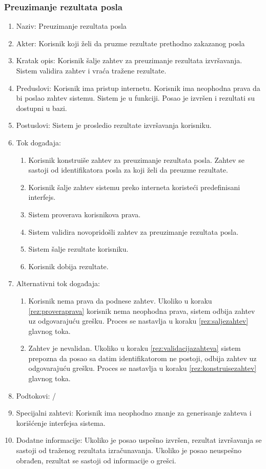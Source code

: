 \documentclass[12pt,oneside]{memoir}
\begin{document}
\subsubsection{Preuzimanje rezultata posla}
\begin{enumerate}
\item Naziv: Preuzimanje rezultata posla
\item Akter: Korisnik koji želi da pruzme rezultate prethodno zakazanog posla
\item Kratak opis: Korisnik šalje zahtev za preuzimanje rezultata izvršavanja. Sistem validira zahtev i vraća tražene rezultate.
\item Preduslovi: Korisnik ima pristup internetu. Korisnik ima neophodna prava da bi poslao zahtev sistemu. Sistem je u funkciji. Posao je izvršen i rezultati su dostupni u bazi.
\item Postuslovi: Sistem je prosledio rezultate izvršavanja korisniku.
\item Tok događaja:
	\begin{enumerate}
	\item \label{rez:konstruisezahtev} Korisnik konstruiše zahtev za preuzimanje rezultata posla. Zahtev se sastoji od identifikatora posla za koji želi da preuzme rezultate.
	\item \label{rez:saljezahtev} Korisnik šalje zahtev sistemu preko interneta koristeći predefinisani interfejs.
	\item \label{rez:proveraprava} Sistem proverava korisnikova prava.
	\item \label{rez:validacijazahteva} Sistem validira novopridošli zahtev za preuzimanje rezultata posla.
	\item \label{rez:sinhslanjerez} Sistem šalje rezultate korisniku.
	\item Korisnik dobija rezultate.
	\end{enumerate}
\item Alternativni tok događaja:
	\begin{enumerate}
	\item Korisnik nema prava da podnese zahtev. Ukoliko u koraku \ref{rez:proveraprava} korisnik nema neophodna prava, sistem odbija zahtev uz odgovarajuću grešku. Proces se nastavlja u koraku \ref{rez:saljezahtev} glavnog toka.
	\item Zahtev je nevalidan. Ukoliko u koraku \ref{rez:validacijazahteva} sistem prepozna da posao sa datim identifikatorom ne postoji, odbija zahtev uz odgovarajuću grešku. Proces se nastavlja u koraku \ref{rez:konstruisezahtev} glavnog toka.
	\end{enumerate}
\item Podtokovi: /
\item Specijalni zahtevi: Korisnik ima neophodno znanje za generisanje zahteva i korišćenje interfejsa sistema.
\item Dodatne informacije: Ukoliko je posao uspešno izvršen, rezultat izvršavanja se sastoji od traženog rezultata izračunavanja. Ukoliko je posao neuspešno obrađen, rezultat se sastoji od informacije o grešci.
\end{enumerate}
\end{document}
